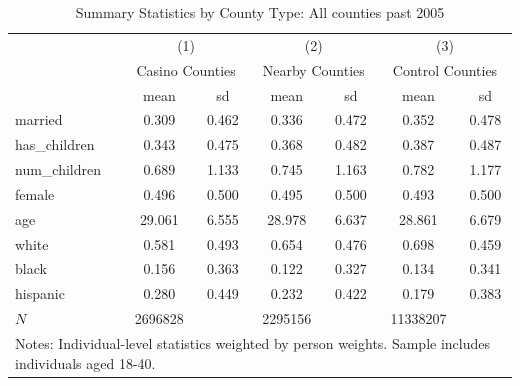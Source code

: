 \begin{table}[htbp]\centering
\def\sym#1{\ifmmode^{#1}\else\(^{#1}\)\fi}
\caption{Summary Statistics by County Type: All counties past 2005}
\begin{tabular}{l*{3}{cc}}
\hline\hline
            &\multicolumn{2}{c}{(1)}  &\multicolumn{2}{c}{(2)}  &\multicolumn{2}{c}{(3)}  \\
            &\multicolumn{2}{c}{Casino Counties}&\multicolumn{2}{c}{Nearby Counties}&\multicolumn{2}{c}{Control Counties}\\
            &        mean&          sd&        mean&          sd&        mean&          sd\\
\hline
married     &       0.309&       0.462&       0.336&       0.472&       0.352&       0.478\\
has\_children&       0.343&       0.475&       0.368&       0.482&       0.387&       0.487\\
num\_children&       0.689&       1.133&       0.745&       1.163&       0.782&       1.177\\
female      &       0.496&       0.500&       0.495&       0.500&       0.493&       0.500\\
age         &      29.061&       6.555&      28.978&       6.637&      28.861&       6.679\\
white       &       0.581&       0.493&       0.654&       0.476&       0.698&       0.459\\
black       &       0.156&       0.363&       0.122&       0.327&       0.134&       0.341\\
hispanic    &       0.280&       0.449&       0.232&       0.422&       0.179&       0.383\\
\hline
\(N\)       &     2696828&            &     2295156&            &    11338207&            \\
\hline\hline
\multicolumn{7}{l}{\footnotesize Notes: Individual-level statistics weighted by person weights. Sample includes individuals aged 18-40.}\\
\end{tabular}
\end{table}
